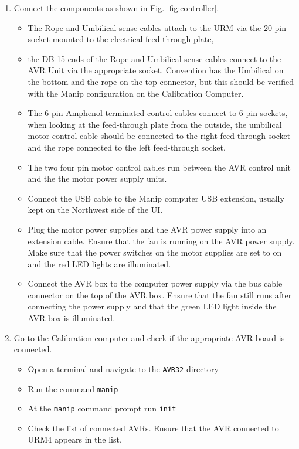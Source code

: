 \documentclass[11pt]{article}
\begin{document}
  
\begin{enumerate}[label={$\square$}]
\item Connect the components as shown in Fig. \ref{fig:controller}.
  \begin{itemize}[label={$\square$}]
  \item The Rope and Umbilical sense cables attach to the URM via the
    20 pin socket mounted to the electrical feed-through plate,
  \item the DB-15 ends of the Rope and Umbilical sense cables connect
    to the AVR Unit via the appropriate socket. Convention has the
    Umbilical on the bottom and the rope on the top connector, but
    this should be verified with the Manip configuration on the
    Calibration Computer.
  \item The 6 pin Amphenol terminated control cables connect to 6 pin
    sockets, when looking at the feed-through plate from the outside,
    the umbilical motor control cable should be connected to the right
    feed-through socket and the rope connected to the left feed-through
    socket.
  \item The two four pin motor control cables run between the AVR
    control unit and the the motor power supply units.
  \item Connect the USB cable to the Manip computer USB extension,
    usually kept on the Northwest side of the UI.
  \item Plug the motor power supplies and the AVR power supply into an
    extension cable. Ensure that the fan is running on the AVR power
    supply. Make sure that the power switches on the motor supplies
    are set to on and the red LED lights are illuminated.
  \item Connect the AVR box to the computer power supply via the bus
    cable connector on the top of the AVR box. Ensure that the fan
    still runs after connecting the power supply and that the green
    LED light inside the AVR box is illuminated.
  \end{itemize}
\item Go to the Calibration computer and check if the appropriate AVR board
  is connected.
  \begin{itemize}[label=$\square$]
  \item Open a terminal and navigate to the \verb+AVR32+ directory
  \item Run the command \verb+manip+
  \item At the \verb+manip+ command prompt run \verb+init+
  \item Check the list of connected AVRs. Ensure that the AVR connected to URM4 appears in the list.

\end{itemize}
\end{enumerate}
\end{document}
